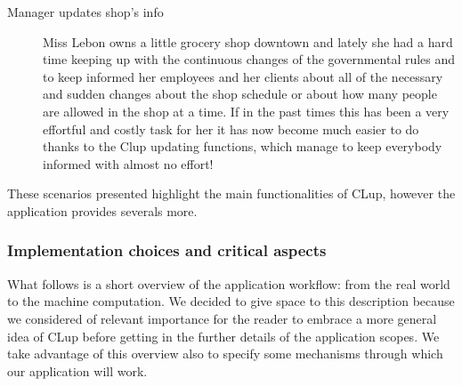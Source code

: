 \begin{description}
    \item[Manager updates shop's info]
    Miss Lebon owns a little grocery shop downtown and lately she had a hard time keeping up with the continuous changes of the governmental rules and to keep informed her employees and her clients about all of the necessary and sudden changes about the shop schedule or about how many people are allowed in the shop at a time. If in the past times this has been a very effortful and costly task for her it has now become much easier to do thanks to the Clup updating functions, which manage to keep everybody informed with almost no effort! 
\end{description}

These scenarios presented highlight the main functionalities of CLup, however the application provides severals more. 

\subsubsection{Implementation choices and critical aspects}
\label{subsubsect:criticalaspects}


What follows is  a short overview of the application workflow: from the real world to the machine computation.
We decided to give space to this description because we considered of relevant importance for the reader to embrace a more general idea of CLup before getting in the further details of the application scopes.
We take advantage of this overview also to specify some mechanisms through which our application will work.


